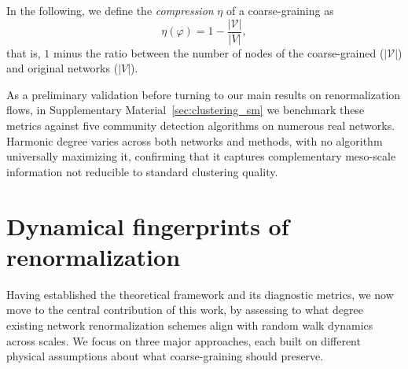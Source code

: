 \documentclass[twocolumn,superscriptaddress,tightenlines,aps,prx,floatfix]{revtex4-2}
\begin{document}
\begin{bibunit}
In the following, we define the \textit{compression} $\eta$ of a coarse-graining as
\begin{equation}
\eta(\varphi) = 1 - \frac{|\mathcal{V}|}{|V|},
\end{equation}
that is, $1$ minus the ratio between the number of nodes of the coarse-grained ($|\mathcal{V}|$) and original networks ($|V|$).

As a preliminary validation before turning to our main results on renormalization flows, in Supplementary Material~\ref{sec:clustering_sm} we benchmark these metrics against five community detection algorithms on numerous real networks. 
Harmonic degree varies across both networks and methods, with no algorithm universally maximizing it, confirming that it captures complementary meso-scale information not reducible to standard clustering quality. 






\section{Dynamical fingerprints of renormalization}
\label{section:RG}

Having established the theoretical framework and its diagnostic metrics, we now move to the central contribution of this work, by assessing to what degree existing network renormalization schemes align with random walk dynamics across scales. We focus on three major approaches, each built on different physical assumptions about what coarse-graining should preserve.



\end{bibunit}
\end{document}
